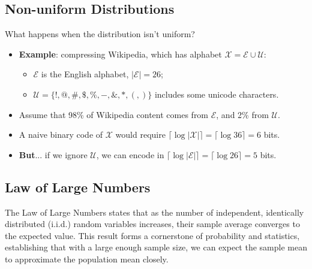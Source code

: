 

\subsection{Non-uniform Distributions}

What happens when the distribution isn’t uniform?



\begin{itemize}
    \item \textbf{Example}: compressing Wikipedia, which has alphabet \( \mathcal{X} = \mathcal{E} \cup \mathcal{U} \):
    \begin{itemize}
        \item \( \mathcal{E} \) is the English alphabet, \( |\mathcal{E}| = 26 \);
        \item \( \mathcal{U} = \{ !, @, \#, \$, \%, -, \&, *, (, ) \} \) includes some unicode characters.
    \end{itemize}

    \item Assume that 98\% of Wikipedia content comes from \( \mathcal{E} \), and 2\% from \( \mathcal{U} \).

    \item A naive binary code of \( \mathcal{X} \) would require \( \lceil \log |\mathcal{X}| \rceil = \lceil \log 36 \rceil = 6 \) bits.

    \item \textbf{But}... if we ignore \( \mathcal{U} \), we can encode in \( \lceil \log |\mathcal{E}| \rceil = \lceil \log 26 \rceil = 5 \) bits.
\end{itemize}



\subsection{Law of Large Numbers}

The Law of Large Numbers states that as the number of independent, identically distributed (i.i.d.) random variables increases, their sample average converges to the expected value. This result forms a cornerstone of probability and statistics, establishing that with a large enough sample size, we can expect the sample mean to approximate the population mean closely.

